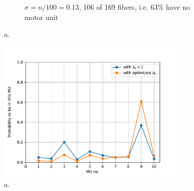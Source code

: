 \begin{figure}
\begin{subfigure}[t]{0.48\textwidth}
    \caption{$\sigma = n/100 = 0.13$, 106 of 169 fibers, i.e. 63\% have no motor unit}%
    \label{fig:MU_fibre_distribution_sparse_13x13_10_sigma_2d_fiber_distribution}%
  \end{subfigure}
  \caption{a.}%
  \label{fig:extraction_result}%
\end{figure}%

\begin{figure}%
  \centering%
  \includegraphics[width=0.8\textwidth]{images/motor_unit_assignment/MU_fibre_distribution_13x13_10_pdf.pdf}%
  \caption{a.}%
  \label{fig:MU_fibre_distribution_13x13_10_pdf}%
\end{figure}

